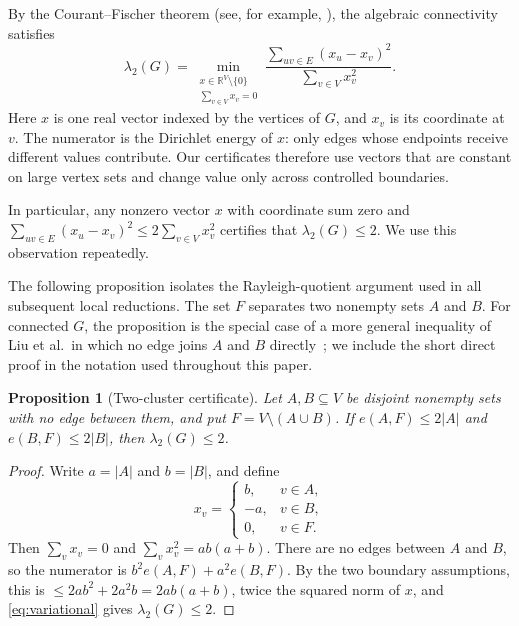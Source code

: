 \documentclass[11pt]{article}
\numberwithin{equation}{section}
\newtheorem{proposition}[theorem]{Proposition}
\theoremstyle{definition}
\theoremstyle{remark}
\newcommand{\ac}{\lambda_2}
\begin{document}
By the Courant--Fischer theorem (see, for example,
\cite{brouwerhaemers2012}), the algebraic connectivity satisfies
\begin{equation}\label{eq:variational}
  \ac(G)
  =
  \min_{\substack{x\in\mathbb{R}^{V}\setminus\{0\}\\
                  \sum_{v\in V}x_v=0}}
  \frac{\displaystyle\sum_{uv\in E}(x_u-x_v)^2}
       {\displaystyle\sum_{v\in V}x_v^2}.
\end{equation}
Here \(x\) is one real vector indexed by the vertices of \(G\), and \(x_v\)
is its coordinate at \(v\).  The numerator is the Dirichlet energy of
\(x\): only edges whose endpoints receive different values contribute.
Our certificates therefore use vectors that are constant on large vertex
sets and change value only across controlled boundaries.

In particular, any nonzero vector \(x\) with coordinate sum zero and
\(\sum_{uv\in E}(x_u-x_v)^2\le2\sum_{v\in V}x_v^2\) certifies that
\(\ac(G)\le2\).  We use this observation repeatedly.

The following proposition isolates the Rayleigh-quotient argument used in all
subsequent local reductions.  The set \(F\) separates two nonempty sets
\(A\) and \(B\).  For connected \(G\), the proposition is the special case of
a more general inequality of Liu et al.\ in which no edge joins \(A\) and
\(B\) directly~\cite[Lemma~3.2]{liu2014}; we include the short direct proof
in the notation used throughout this paper.

\begin{proposition}[Two-cluster certificate]\label{lem:two-cluster}
Let \(A,B\subseteq V\) be disjoint nonempty sets with no edge between
them, and put \(F=V\setminus(A\cup B)\).  If \(e(A,F)\le2|A|\) and
\(e(B,F)\le2|B|\), then \(\ac(G)\le2\).
\end{proposition}

\begin{proof}
Write \(a=|A|\) and \(b=|B|\), and define
\[
  x_v=
  \begin{cases}
    b,  & v\in A,\\
    -a, & v\in B,\\
    0,  & v\in F.
  \end{cases}
\]
Then \(\sum_v x_v=0\) and \(\sum_v x_v^2=ab(a+b)\).  There are no edges
between \(A\) and \(B\), so the numerator is
\(b^2e(A,F)+a^2e(B,F)\).  By the two boundary assumptions, this is
\(\le2ab^2+2a^2b=2ab(a+b)\), twice the squared norm of \(x\), and
\eqref{eq:variational} gives \(\ac(G)\le2\).
\end{proof}
\end{document}
